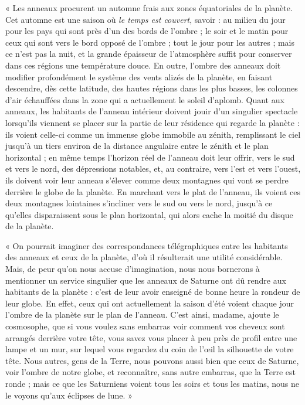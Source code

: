 \documentclass[a4paper, 11pt, oneside, landscape]{article}
\begin{document}
« Les anneaux procurent un automne frais aux zones équatoriales de la planète. Cet automne est une saison où \emph{le temps est couvert}, savoir : au milieu du jour pour les pays qui sont près d'un des bords de l'ombre ; le soir et le matin pour ceux qui sont vers le bord opposé de l'ombre ; tout le jour pour les autres ; mais ce n'est pas la nuit, et la grande épaisseur de l'atmosphère suffit pour conserver dans ces régions une température douce. En outre, l'ombre des anneaux doit modifier profondément le système des vents alizés de la planète, en faisant descendre, dès cette latitude, des hautes régions dans les plus basses, les colonnes d'air échauffées dans la zone qui a actuellement le soleil d'aplomb. Quant aux anneaux, les habitants de l'anneau intérieur doivent jouir d'un singulier spectacle lorsqu'ils viennent se placer sur la partie de leur résidence qui regarde la planète : ils voient celle-ci comme un immense globe immobile au zénith, remplissant le ciel jusqu'à un tiers environ de la distance angulaire entre le zénith et le plan horizontal ; en même temps l'horizon réel de l'anneau doit leur offrir, vers le sud et vers le nord, des dépressions notables, et, au contraire, vers l'est et vers l'ouest, ils doivent voir leur anneau s'élever comme deux montagnes qui vont se perdre derrière le globe de la planète. En marchant vers le plat de l'anneau, ils voient ces deux montagnes lointaines s'incliner vers le sud ou vers le nord, jusqu'à ce qu'elles disparaissent sous le plan horizontal, qui alors cache la moitié du disque de la planète.

« On pourrait imaginer des correspondances télégraphiques entre les habitants des anneaux et ceux de la planète, d'où il résulterait une utilité considérable. Mais, de peur qu'on nous accuse d'imagination, nous nous bornerons à mentionner un service singulier que les anneaux de Saturne ont dû rendre aux habitants de la planète : c'est de leur avoir enseigné de bonne heure la rondeur de leur globe. En effet, ceux qui ont actuellement la saison d'été voient chaque jour l'ombre de la planète sur le plan de l'anneau. C'est ainsi, madame, ajoute le cosmosophe, que si vous voulez sans embarras voir comment vos cheveux sont arrangés derrière votre tête, vous savez vous placer à peu près de profil entre une lampe et un mur, sur lequel vous regardez du coin de l'œil la silhouette de votre tête. Nous autres, gens de la Terre, nous pouvons aussi bien que ceux de Saturne, voir l'ombre de notre globe, et reconnaître, sans autre embarras, que la Terre est ronde ; mais ce que les Saturniens voient tous les soirs et tous les matins, nous ne le voyons qu'aux éclipses de lune. »
\end{document}
